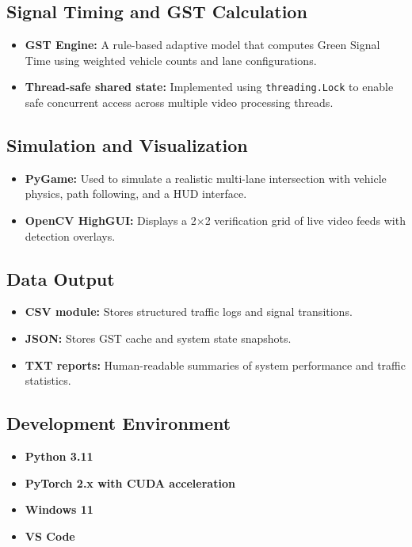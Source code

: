 \subsection{Signal Timing and GST Calculation}
\begin{itemize}
    \item \textbf{GST Engine:} A rule-based adaptive model that computes Green Signal Time using weighted vehicle counts and lane configurations.
    \item \textbf{Thread-safe shared state:} Implemented using \texttt{threading.Lock} to enable safe concurrent access across multiple video processing threads.
\end{itemize}

\subsection{Simulation and Visualization}
\begin{itemize}
    \item \textbf{PyGame:} Used to simulate a realistic multi-lane intersection with vehicle physics, path following, and a HUD interface.
    \item \textbf{OpenCV HighGUI:} Displays a 2$\times$2 verification grid of live video feeds with detection overlays.
\end{itemize}

\subsection{Data Output}
\begin{itemize}
    \item \textbf{CSV module:} Stores structured traffic logs and signal transitions.
    \item \textbf{JSON:} Stores GST cache and system state snapshots.
    \item \textbf{TXT reports:} Human-readable summaries of system performance and traffic statistics.
\end{itemize}

\subsection{Development Environment}
\begin{itemize}
    \item \textbf{Python 3.11}
    \item \textbf{PyTorch 2.x with CUDA acceleration}
    \item \textbf{Windows 11}
    \item \textbf{VS Code}
\end{itemize}


